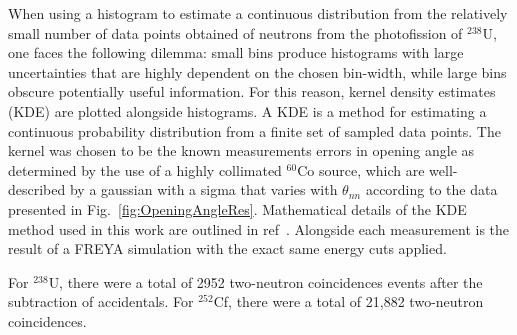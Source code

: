 When using a histogram to estimate a continuous distribution from the relatively small number of data points obtained of neutrons from the photofission of $^{238}$U, one faces the following dilemma: small bins produce histograms with large uncertainties that are highly dependent on the chosen bin-width, while large bins obscure potentially useful information. 
For this reason, kernel density estimates (KDE) are plotted alongside histograms.
A KDE is a method for estimating a continuous probability distribution from a finite set of sampled data points.
The kernel was chosen to be the known measurements errors in opening angle as determined by the use of a highly collimated $^{60}$Co source, which are well-described by a gaussian with a sigma that varies with $\theta_{nn}$ according to the data presented in Fig.~\ref{fig:OpeningAngleRes}.
Mathematical details of the KDE method used in this work are outlined in ref~\cite{KDE}. 
Alongside each measurement is the result of a FREYA simulation with the exact same energy cuts applied.

For $^{238}$U, there were a total of 2952 two-neutron coincidences events after the subtraction of accidentals.
For $^{252}$Cf, there were a total of 21,882 two-neutron coincidences.


